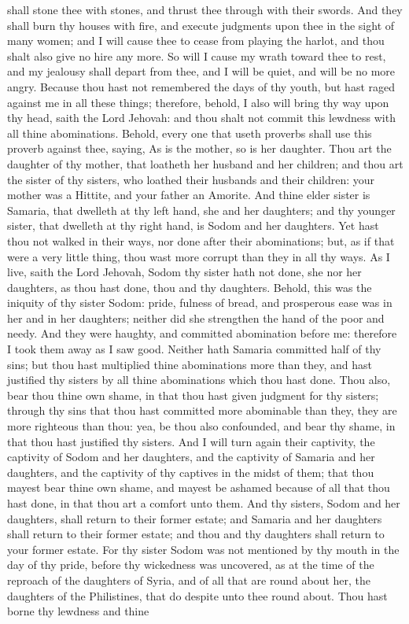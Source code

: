 shall stone thee with stones, and thrust thee through with their swords. And they shall burn thy houses with fire, and execute judgments upon thee in the sight of many women; and I will cause thee to cease from playing the harlot, and thou shalt also give no hire any more. So will I cause my wrath toward thee to rest, and my jealousy shall depart from thee, and I will be quiet, and will be no more angry. Because thou hast not remembered the days of thy youth, but hast raged against me in all these things; therefore, behold, I also will bring thy way upon thy head, saith the Lord Jehovah: and thou shalt not commit this lewdness with all thine abominations.  Behold, every one that useth proverbs shall use this proverb against thee, saying, As is the mother, so is her daughter. Thou art the daughter of thy mother, that loatheth her husband and her children; and thou art the sister of thy sisters, who loathed their husbands and their children: your mother was a Hittite, and your father an Amorite. And thine elder sister is Samaria, that dwelleth at thy left hand, she and her daughters; and thy younger sister, that dwelleth at thy right hand, is Sodom and her daughters. Yet hast thou not walked in their ways, nor done after their abominations; but, as if that were a very little thing, thou wast more corrupt than they in all thy ways. As I live, saith the Lord Jehovah, Sodom thy sister hath not done, she nor her daughters, as thou hast done, thou and thy daughters. Behold, this was the iniquity of thy sister Sodom: pride, fulness of bread, and prosperous ease was in her and in her daughters; neither did she strengthen the hand of the poor and needy. And they were haughty, and committed abomination before me: therefore I took them away as I saw good. Neither hath Samaria committed half of thy sins; but thou hast multiplied thine abominations more than they, and hast justified thy sisters by all thine abominations which thou hast done. Thou also, bear thou thine own shame, in that thou hast given judgment for thy sisters; through thy sins that thou hast committed more abominable than they, they are more righteous than thou: yea, be thou also confounded, and bear thy shame, in that thou hast justified thy sisters.  And I will turn again their captivity, the captivity of Sodom and her daughters, and the captivity of Samaria and her daughters, and the captivity of thy captives in the midst of them; that thou mayest bear thine own shame, and mayest be ashamed because of all that thou hast done, in that thou art a comfort unto them. And thy sisters, Sodom and her daughters, shall return to their former estate; and Samaria and her daughters shall return to their former estate; and thou and thy daughters shall return to your former estate. For thy sister Sodom was not mentioned by thy mouth in the day of thy pride, before thy wickedness was uncovered, as at the time of the reproach of the daughters of Syria, and of all that are round about her, the daughters of the Philistines, that do despite unto thee round about. Thou hast borne thy lewdness and thine 